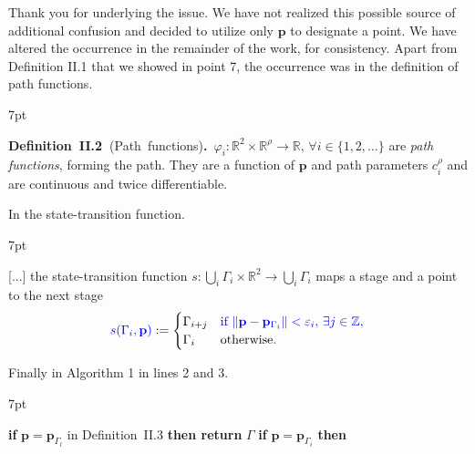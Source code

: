\documentclass[10pt]{letter}
\newenvironment{formal}{%
  \def\FrameCommand{%
    \hspace{1pt}%
    {\color{red}\vrule width 2pt}%
    {\color{formalshade}\vrule width 4pt}%
    \colorbox{formalshade}%
  }%
  \MakeFramed{\advance\hsize-\width\FrameRestore}%
  \noindent\hspace{-4.55pt}%
  \begin{adjustwidth}{}{7pt}%
  \vspace{2pt}\vspace{2pt}%
}
{%
  \vspace{2pt}\end{adjustwidth}\endMakeFramed%
}
\DeclarePairedDelimiter\norm{\lVert}{\rVert}%
\begin{document}
{\color{blue} 

{\hspace*{-4.5em}{[R1:10]}\vspace*{-1.9em}}

Thank you for underlying the issue. We have not realized this possible source of additional confusion and decided to utilize only $\mathbf{p}$ to designate a point. We have altered the occurrence in the remainder of the work, for consistency. Apart from Definition II.1 that we showed in point 7, the occurrence was in the definition of path functions.

\begin{formal}
  \color{black}
  \textbf{Definition~II.2~}(Path~functions)\textbf{.}~$\varphi_i:\mathbb{R}^2\times\mathbb{R}^\rho\rightarrow\mathbb{R},\,\forall i\in\{1,2,\dots\}
  $ are \emph{path functions}, forming the path. They are a function of {\color{blue}$\mathbf{p}%
  $} and path parameters $c_i^\rho%
  $ and are continuous and twice differentiable.
  \vspace*{1ex}
\end{formal}

In the state-transition function.

\begin{formal}
  \color{black}
  [...] the state-transition function $s:\bigcup_i{\Gamma_i}\times\mathbb{R}^2\rightarrow\bigcup_i{\Gamma_i}$ maps a stage and a point to the next stage
  \begin{equation*}{\color{blue}s(\Gamma_i,\mathbf{p}%
    )}:=\begin{cases}
    \Gamma_{i+j} & {\color{blue}\text{if }\norm{\mathbf{p}%
    -\mathbf{p}_{\Gamma_i}}<\varepsilon_i,\,\exists j\in\mathbb{Z},}\\
    \Gamma_i & \text{otherwise}.
  \end{cases}\end{equation*}
\end{formal}

Finally in Algorithm 1 in lines 2 and 3.

\begin{formal}
  \begin{algorithmic}[1]
    \small
      \makeatletter
      \setcounter{ALC@line}{1}
      \makeatother
      \STATE \textbf{if} $\mathbf{p}%
      =\mathbf{p}_{\Gamma_l}${ in Definition~{\color{red}II.3}} \textbf{then return }$\Gamma$\vspace*{.3ex}
      \vspace*{.8ex}
      \STATE \textbf{if} $\mathbf{p}%
      =\mathbf{p}_{\Gamma_i}$ \textbf{then}
    \end{algorithmic}
  \end{formal}  

}
\end{document}

